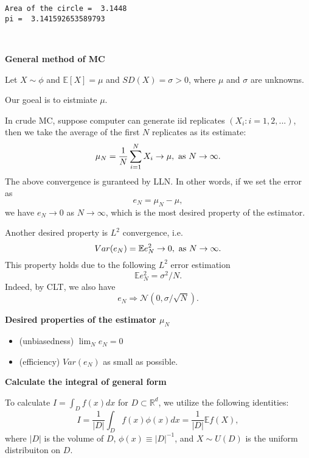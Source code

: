 \documentclass[11pt]{article}
\providecommand{\tightlist}{%
      \setlength{\itemsep}{0pt}\setlength{\parskip}{0pt}}
\begin{document}
    \begin{Verbatim}[commandchars=\\\{\}]
Area of the circle =  3.1448
pi =  3.141592653589793

    \end{Verbatim}

    \begin{center}
    \end{center}
    { \hspace*{\fill} \\}
    
    \textbf{General method of MC}

Let \(X\sim \phi\) and \(\mathbb E[X] = \mu\) and \(SD(X) = \sigma>0\),
where \(\mu\) and \(\sigma\) are unknowns.

Our goeal is to eistmiate \(\mu\).

In crude MC, suppose computer can generate iid replicates
\((X_i: i = 1, 2, ...)\), then we take the average of the first \(N\)
replicates as its estimate:
\[\mu_N  = \frac 1 N \sum_{i=1}^N X_i \to \mu, \hbox{ as } N\to \infty.\]
The above convergence is guranteed by LLN. In other words, if we set the
error as \[e_N = \mu_N - \mu,\] we have \(e_N \to 0\) as
\(N\to \infty\), which is the most desired property of the estimator.

Another desired property is \(L^2\) convergence, i.e.
\[Var(e_N) = \mathbb E e_N^2 \to 0, \hbox{ as } N\to \infty.\] This
property holds due to the following \(L^2\) error estimation
\[\mathbb E e_N^2 =  \sigma^2/N.\] Indeed, by CLT, we also have
\[e_N \Rightarrow \mathcal{N}(0, \sigma/\sqrt{N}).\]

\textbf{Desired properties of the estimator \(\mu_N\)}

\begin{itemize}
\tightlist
\item
  (unbiasedness) \(\lim_N e_N = 0\)
\item
  (efficiency) \(Var(e_N)\) as small as possible.
\end{itemize}

    \textbf{Calculate the integral of general form}

To calculate \(I = \int_D f(x) dx\) for \(D\subset \mathbb R^d\), we
utilize the following identities:
\[I = \frac{1}{|D|} \int_D f(x) \phi(x) dx =  \frac{1}{|D|} \mathbb E f(X),\]
where \(|D|\) is the volume of \(D\), \(\phi (x) \equiv |D|^{-1}\), and
\(X\sim U(D)\) is the uniform distribuiton on \(D\).
\end{document}
